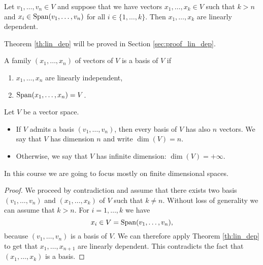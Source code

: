 \documentclass[11pt,nocut]{article}
\begin{document}
\begin{theorem}\label{th:lin_dep}
	Let $v_1, \dots, v_n \in V$ and suppose that we have vectors $x_1, \dots, x_k \in V$ such that $k > n$ and $x_i \in {{\rm Span}}(v_1, \dots, v_n)$ for all $i \in \{1, \dots, k\}$.
	Then $x_1, \dots, x_k$ are linearly dependent.
\end{theorem}
Theorem \ref{th:lin_dep} will be proved in Section \ref{sec:proof_lin_dep}.
\\

\begin{definition}[Basis]
	A family $(x_1, \dots, x_n)$ of vectors of $V$ is a basis of $V$ if
	\begin{enumerate}[label=(\roman*)]
		\item $x_1, \dots, x_n$ are linearly independent,
		\item ${{\rm Span}}(x_1, \dots, x_n) = V$.
	\end{enumerate}
\end{definition}

\begin{definition}[Dimension]
	Let $V$ be a vector space.
	\begin{itemize}
		\item If $V$ admits a basis $(v_1, \dots, v_n)$, then every basis of $V$ has also $n$ vectors. We say that $V$ has dimension $n$ and write $\dim(V) = n$.
		\item Otherwise, we say that $V$ has infinite dimension: $\dim(V) = +\infty$.
	\end{itemize}
\end{definition}
In this course we are going to focus mostly on finite dimensional spaces.
\\
\begin{proof}
	We proceed by contradiction and assume that there exists two basis $(v_1, \dots, v_n)$ and $(x_1, \dots, x_k)$ of $V$ such that $k \neq n$. Without loss of generality we can assume that $k > n$. For $i = 1, \dots, k$ we have
	$$
	x_i \in V = {{\rm Span}}(v_1, \dots, v_n),
	$$
	because $(v_1, \dots, v_n)$ is a basis of $V$. We can therefore apply Theorem \ref{th:lin_dep} to get that $x_1, \dots, x_{n+1}$ are linearly dependent. This contradicts the fact that $(x_1, \dots, x_{k})$ is a basis.
\end{proof}
\\
\end{document}
